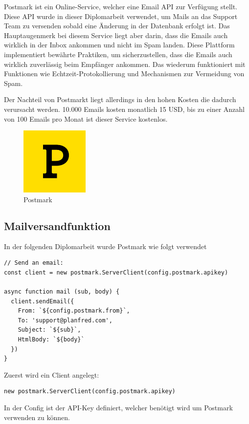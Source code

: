 Postmark ist ein Online-Service, welcher eine Email API zur Verfügung stellt. Diese API wurde in dieser Diplomarbeit verwendet, um Mails an das Support Team zu versenden sobald eine Änderung in der Datenbank erfolgt ist. Das Hauptaugenmerk bei diesem Service liegt aber darin, dass die Emails auch wirklich in der Inbox ankommen und nicht im Spam landen. Diese Plattform implementiert bewährte Praktiken, um sicherzustellen, dass die Emails auch wirklich zuverlässig beim Empfänger ankommen. Das wiederum funktioniert mit Funktionen wie Echtzeit-Protokollierung und Mechanismen zur Vermeidung von Spam.

Der Nachteil von Postmarkt liegt allerdings in den hohen Kosten die dadurch verursacht werden. 10.000 Emails kosten monatlich 15 USD, bis zu einer Anzahl von 100 Emails pro Monat ist dieser Service kostenlos.

\begin{figure}[h!]
    \centering
    \includegraphics[width=0.3\textwidth]{pics/postmark.png}
    \caption{Postmark}
    \label{fig:enter-label}
\end{figure}


\subsection{Mailversandfunktion}

In der folgenden Diplomarbeit wurde Postmark wie folgt verwendet


\begin{lstlisting}
// Send an email:
const client = new postmark.ServerClient(config.postmark.apikey)

async function mail (sub, body) {
  client.sendEmail({
    From: `${config.postmark.from}`,
    To: 'support@planfred.com',
    Subject: `${sub}`,
    HtmlBody: `${body}`
  })
}
\end{lstlisting}

Zuerst wird ein Client angelegt:
\begin{lstlisting}
new postmark.ServerClient(config.postmark.apikey)
\end{lstlisting}
In der Config ist der API-Key definiert, welcher benötigt wird um Postmark verwenden zu können.

